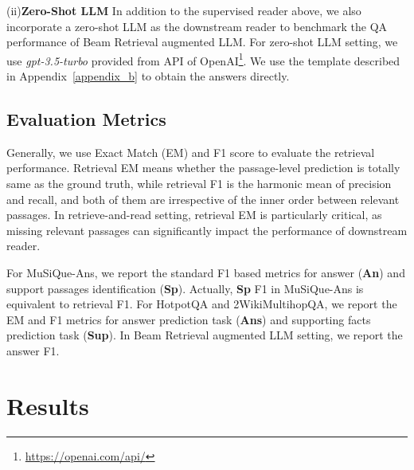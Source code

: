 \documentclass[10.5pt]{article}
\begin{document}
(ii)\textbf{Zero-Shot LLM}
In addition to the supervised reader above, we also incorporate a zero-shot LLM as the downstream reader to benchmark the QA performance of Beam Retrieval augmented LLM. For zero-shot LLM setting, we use \emph{gpt-3.5-turbo} provided from API of OpenAI\footnote{\url{https://openai.com/api/}}. We use the template described in Appendix~\ref{appendix_b} to obtain the answers directly.
\subsection{Evaluation Metrics}
Generally, we use Exact Match (EM) and F1 score to evaluate the retrieval performance. Retrieval EM means whether the passage-level prediction is totally same as the ground truth, while retrieval F1 is the harmonic mean of precision and recall, and both of them are irrespective of the inner order between relevant passages. In retrieve-and-read setting, retrieval EM is particularly critical, as missing relevant passages can significantly impact the performance of downstream reader. 

For MuSiQue-Ans, we report the standard F1 based metrics for answer (\textbf{An}) and support passages identification (\textbf{Sp}). Actually, \textbf{Sp} F1 in MuSiQue-Ans is equivalent to retrieval F1. For HotpotQA and 2WikiMultihopQA, we report the EM and F1 metrics for answer prediction task (\textbf{Ans}) and supporting facts prediction task (\textbf{Sup}). In Beam Retrieval augmented LLM setting, we report the answer F1.

\section{Results}
\end{document}
